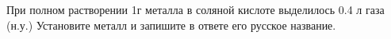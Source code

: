 
При полном растворении 1г металла в соляной кислоте выделилось 0.4 л газа (н.у.)
Установите металл и запишите в ответе его русское название.

